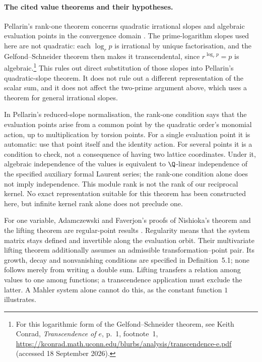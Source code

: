 \paragraph{The cited value theorems and their hypotheses.}
Pellarin's rank-one theorem concerns quadratic irrational slopes and
algebraic evaluation points in the convergence domain
\cite[Theorem~1.1 and Remark~1.2, pp.~330--332]{pellarin2006}.
The prime-logarithm slopes used here are not quadratic: each $\log_r p$
is irrational by unique factorisation, and the Gelfond--Schneider theorem
then makes it transcendental, since $r^{\log_r p}=p$ is algebraic.\footnote{For this logarithmic form of the Gelfond--Schneider theorem, see Keith
Conrad, \emph{Transcendence of $e$}, p.~1, footnote~1,
\url{https://kconrad.math.uconn.edu/blurbs/analysis/transcendence-e.pdf}
(accessed 18 September 2026).}
This rules out direct substitution of those slopes into Pellarin's
quadratic-slope theorem.  It does not rule out a different representation
of the scalar sum, and it does not affect the two-prime argument above,
which uses a theorem for general irrational slopes.

In Pellarin's reduced-slope normalisation, the rank-one condition says
that the evaluation points arise from a common point by the quadratic
order's monomial action, up to
multiplication by torsion points.  For a single evaluation point it is
automatic: use that point itself and the identity action.  For several
points it is a condition to check, not a consequence of having two
lattice coordinates.  Under it, algebraic independence of the values is
equivalent to $\Q$-linear independence of the specified auxiliary formal
Laurent series; the rank-one condition alone does not imply independence.
This module rank is not the rank of our reciprocal kernel.  No exact
representation suitable for this theorem has been constructed here, but
infinite kernel rank alone does not preclude one.

For one variable, Adamczewski and Faverjon's proofs of Nishioka's theorem
and the lifting theorem are regular-point results
\cite[Theorems~1 and 2]{adamczewskifaverjon2023}.  Regularity means that the
system matrix stays defined and invertible along the evaluation orbit.
Their multivariate lifting theorem
\cite[Theorem~3.3]{adamczewskifaverjon2026} additionally assumes an admissible
transformation--point pair.  Its growth, decay and nonvanishing conditions
are specified in Definition~5.1; none follows merely from writing a double
sum.  Lifting transfers a relation among values to one among functions;
a transcendence application must exclude the latter.  A Mahler system
alone cannot do this, as the constant function $1$ illustrates.

